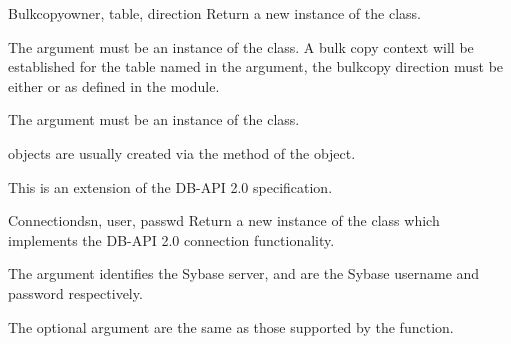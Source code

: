 \begin{classdesc}{Bulkcopy}{owner, table, direction}
Return a new instance of the  class.

The  argument must be an instance of the 
class.  A bulk copy context will be established for the table named in
the  argument, the bulkcopy direction must be either
 or  as defined in the
 module.

The  argument must be an instance of the 
class.

 objects are usually created via the
 method of the  object.

This is an extension of the DB-API 2.0 specification.
\end{classdesc}

\begin{classdesc}{Connection}{dsn, user, passwd \optional{, \ldots}}
Return a new instance of the  class which implements
the DB-API 2.0 connection functionality.

The  argument identifies the Sybase server,  and
 are the Sybase username and password respectively.

The optional argument are the same as those supported by the
 function.
\end{classdesc}

